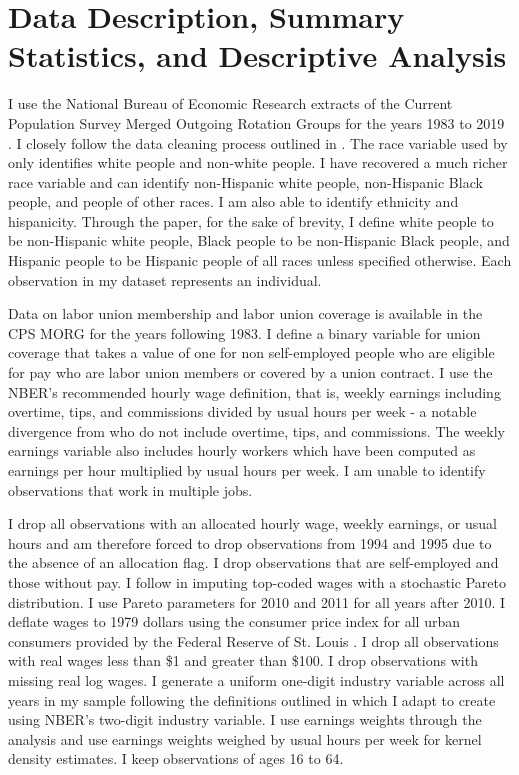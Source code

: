 \documentclass[11pt]{article}
\begin{document}
\section{Data Description, Summary Statistics, and Descriptive Analysis}\label{sec:data}
I use the National Bureau of Economic Research extracts of the Current Population Survey Merged Outgoing Rotation Groups for the years 1983 to 2019 \citep{nbercps}. I closely follow the data cleaning process outlined in \citet{fll2021}. The race variable used by \citet{fll2021} only identifies white people and non-white people. I have recovered a much richer race variable and can identify non-Hispanic white people, non-Hispanic Black people, and people of other races. I am also able to identify ethnicity and hispanicity. Through the paper, for the sake of brevity, I define white people to be non-Hispanic white people, Black people to be non-Hispanic Black people, and Hispanic people to be Hispanic people of all races unless specified otherwise. Each observation in my dataset represents an individual.

Data on labor union membership and labor union coverage is available in the CPS MORG for the years following 1983. I define a binary variable for union coverage that takes a value of one for non self-employed people who are eligible for pay who are labor union members or covered by a union contract. I use the NBER's recommended hourly wage definition, that is, weekly earnings including overtime, tips, and commissions divided by usual hours per week - a notable divergence from \citet{fll2021} who do not include overtime, tips, and commissions. The weekly earnings variable also includes hourly workers which have been computed as earnings per hour multiplied by usual hours per week. I am unable to identify observations that work in multiple jobs. 

I drop all observations with an allocated hourly wage, weekly earnings, or usual hours and am therefore forced to drop observations from 1994 and 1995 due to the absence of an allocation flag. I drop observations that are self-employed and those without pay. I follow \citet{fll2021} in imputing top-coded wages with a stochastic Pareto distribution. I use Pareto parameters for 2010 and 2011 for all years after 2010. I deflate wages to 1979 dollars using the consumer price index for all urban consumers provided by the Federal Reserve of St. Louis \citep{cpiaucsl}. I drop all observations with real wages less than \$1 and greater than \$100. I drop observations with missing real log wages. I generate a uniform one-digit industry variable across all years in my sample following the definitions outlined in \citet{fll2021} which I adapt to create using NBER's two-digit industry variable. I use earnings weights through the analysis and use earnings weights weighed by usual hours per week for kernel density estimates. I keep observations of ages 16 to 64.
\end{document}
